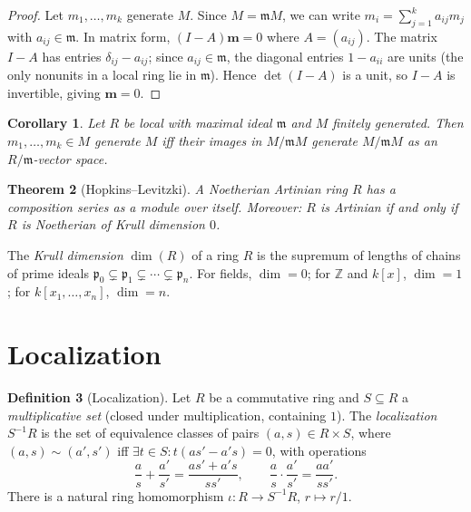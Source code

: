 \documentclass[12pt,a4paper]{amsart}
\newtheorem{theorem}{Theorem}[section]
\newtheorem{corollary}[theorem]{Corollary}
\theoremstyle{definition}
\newtheorem{definition}[theorem]{Definition}
\theoremstyle{definition}
\begin{document}
\begin{proof}
Let $m_1,\ldots,m_k$ generate $M$. Since $M = \mathfrak{m}M$, we can write
$m_i = \sum_{j=1}^k a_{ij} m_j$ with $a_{ij} \in \mathfrak{m}$.
In matrix form, $(I - A)\mathbf{m} = 0$ where $A = (a_{ij})$.
The matrix $I - A$ has entries $\delta_{ij} - a_{ij}$; since $a_{ij} \in \mathfrak{m}$,
the diagonal entries $1 - a_{ii}$ are units (the only nonunits in a local ring lie
in $\mathfrak{m}$). Hence $\det(I-A)$ is a unit, so $I-A$ is invertible, giving $\mathbf{m} = 0$.
\end{proof}

\begin{corollary}
Let $R$ be local with maximal ideal $\mathfrak{m}$ and $M$ finitely generated.
Then $m_1,\ldots,m_k \in M$ generate $M$ iff their images in $M/\mathfrak{m}M$ generate
$M/\mathfrak{m}M$ as an $R/\mathfrak{m}$-vector space.
\end{corollary}

\begin{theorem}[Hopkins--Levitzki]
A Noetherian Artinian ring $R$ has a composition series as a module over itself.
Moreover: $R$ is Artinian if and only if $R$ is Noetherian of Krull dimension $0$.
\end{theorem}

The \emph{Krull dimension} $\dim(R)$ of a ring $R$ is the supremum of lengths of
chains of prime ideals $\mathfrak{p}_0 \subsetneq \mathfrak{p}_1 \subsetneq \cdots \subsetneq \mathfrak{p}_n$.
For fields, $\dim = 0$; for $\mathbb{Z}$ and $k[x]$, $\dim = 1$; for $k[x_1,\ldots,x_n]$, $\dim = n$.

\section{Localization}

\begin{definition}[Localization]
Let $R$ be a commutative ring and $S \subseteq R$ a \emph{multiplicative set}
(closed under multiplication, containing $1$). The \emph{localization}
$S^{-1}R$ is the set of equivalence classes of pairs $(a, s) \in R \times S$,
where $(a,s) \sim (a',s')$ iff $\exists t \in S: t(as' - a's) = 0$, with operations
\[
  \frac{a}{s} + \frac{a'}{s'} = \frac{as' + a's}{ss'}, \qquad
  \frac{a}{s} \cdot \frac{a'}{s'} = \frac{aa'}{ss'}.
\]
There is a natural ring homomorphism $\iota\colon R \to S^{-1}R$, $r \mapsto r/1$.
\end{definition}
\end{document}
